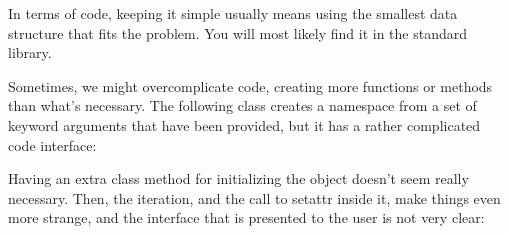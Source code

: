\documentclass[a4paper,10pt,english]{sphinxmanual}
\begin{document}
In terms of code, keeping it simple usually means using the smallest data structure that fits the problem.
You will most likely find it in the standard library.

Sometimes, we might over\sphinxhyphen{}complicate code, creating more functions or methods than what’s necessary. The
following class creates a namespace from a set of keyword arguments that have been provided, but it has a
rather complicated code interface:

\begin{sphinxVerbatim}[commandchars=\\\{\}]
 

        

      
          
            
               
                  
         
\end{sphinxVerbatim}

Having an extra class method for initializing the object doesn’t seem really necessary. Then, the iteration,
and the call to setattr inside it, make things even more strange, and the interface that is presented to the
user is not very clear:

\begin{sphinxVerbatim}[commandchars=\\\{\}]
  
  
 
\end{sphinxVerbatim}
\end{document}
